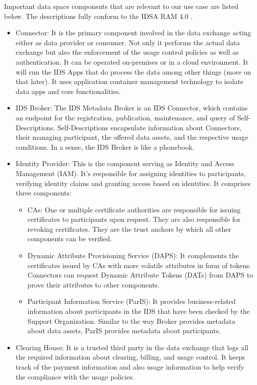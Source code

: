 \documentclass{article}
\begin{document}
Important data space components that are relevant to our use case are listed below. The descriptions fully conform to the IDSA RAM 4.0 \cite{otto_ids_2019}.
\begin{itemize}
    \item Connector: It is the primary component involved in the data exchange acting either as data provider or consumer. Not only it performs the actual data exchange but also the enforcement of the usage control policies as well as authentication. It can be operated on-premises or in a cloud environment. It will run the IDS Apps that do process the data among other things (more on that later). It uses application container management technology to isolate data apps and core functionalities.
    \item IDS Broker: The IDS Metadata Broker is an IDS Connector, which contains an endpoint for the registration, publication, maintenance, and query of Self-Descriptions. Self-Descriptions encapsulate information about Connectors, their managing participant, the offered data assets, and the respective usage conditions. In a sense, the IDS Broker is like a phonebook.
    \item Identity Provider: This is the component serving as Identity and Access Management (IAM). It's responsible for assigning identities to participants, verifying identity claims and granting access based on identities. It comprises three components: 
        \begin{itemize}
            \item CAs: One or multiple certificate authorities are responsible for issuing certificates to participants upon request. They are also responsible for revoking certificates. They are the trust anchors by which all other components can be verified.
            \item Dynamic Attribute Provisioning Service (DAPS): It complements the certificates issued by CAs with more volatile attributes in form of tokens. Connectors can request Dynamic Attribute Tokens (DATs) from DAPS to prove their attributes to other components.
            \item Participant Information Service (ParIS):  It provides business-related information about participants in the IDS that have been checked by the Support Organization. Similar to the way Broker provides metadata about data assets, ParIS provides metadata about participants.
        \end{itemize}
    \item Clearing House: It is a trusted third party in the data exchange that logs all the required information about clearing, billing, and usage control. It keeps track of the payment information and also usage information to help verify the compliance with the usage policies.

\end{itemize}
\end{document}
